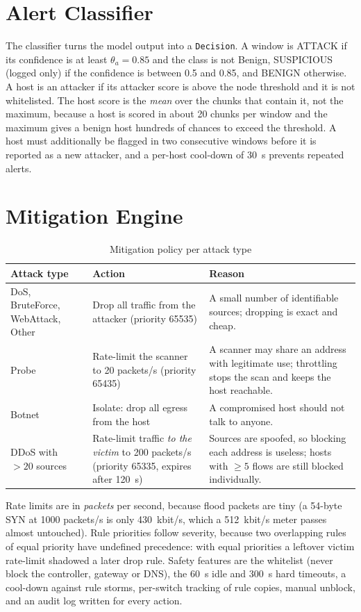 \section{Alert Classifier}
The classifier turns the model output into a \texttt{Decision}. A window is ATTACK if its confidence is at least $\theta_a=0.85$ and the class is not Benign, SUSPICIOUS (logged only) if the confidence is between 0.5 and 0.85, and BENIGN otherwise. A host is an attacker if its attacker score is above the node threshold and it is not whitelisted. The host score is the \emph{mean} over the chunks that contain it, not the maximum, because a host is scored in about 20 chunks per window and the maximum gives a benign host hundreds of chances to exceed the threshold. A host must additionally be flagged in two consecutive windows before it is reported as a new attacker, and a per-host cool-down of 30~s prevents repeated alerts.

\section{Mitigation Engine}

\begin{table}[htbp]
\centering
\caption{Mitigation policy per attack type}
\label{tab:policy}
\small
\begin{tabularx}{\textwidth}{|p{2.6cm}|p{3.7cm}|X|}
\hline
\textbf{Attack type} & \textbf{Action} & \textbf{Reason} \\ \hline
DoS, BruteForce, WebAttack, Other & Drop all traffic from the attacker (priority 65535) & A small number of identifiable sources; dropping is exact and cheap. \\ \hline
Probe & Rate-limit the scanner to 20 packets/s (priority 65435) & A scanner may share an address with legitimate use; throttling stops the scan and keeps the host reachable. \\ \hline
Botnet & Isolate: drop all egress from the host & A compromised host should not talk to anyone. \\ \hline
DDoS with $>20$ sources & Rate-limit traffic \emph{to the victim} to 200 packets/s (priority 65335, expires after 120~s) & Sources are spoofed, so blocking each address is useless; hosts with $\ge 5$ flows are still blocked individually. \\ \hline
\end{tabularx}
\end{table}

Rate limits are in \emph{packets} per second, because flood packets are tiny (a 54-byte SYN at 1000 packets/s is only 430~kbit/s, which a 512~kbit/s meter passes almost untouched). Rule priorities follow severity, because two overlapping rules of equal priority have undefined precedence: with equal priorities a leftover victim rate-limit shadowed a later drop rule. Safety features are the whitelist (never block the controller, gateway or DNS), the 60~s idle and 300~s hard timeouts, a cool-down against rule storms, per-switch tracking of rule copies, manual unblock, and an audit log written for every action.

